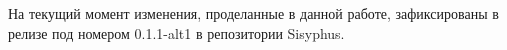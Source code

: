 \documentclass[bachelor, och, pract]{SCWorks}
\begin{document}
На текущий момент изменения, проделанные в данной работе, зафиксированы в релизе под номером 0.1.1-alt1 в репозитории Sisyphus.

%

%



\appendix
\end{document}
